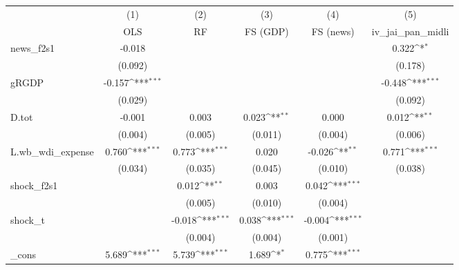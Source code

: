 {
\def\sym#1{\ifmmode^{#1}\else\(^{#1}\)\fi}
\begin{tabular}{l*{5}{c}}
\toprule
            &\multicolumn{1}{c}{(1)}&\multicolumn{1}{c}{(2)}&\multicolumn{1}{c}{(3)}&\multicolumn{1}{c}{(4)}&\multicolumn{1}{c}{(5)}\\
            &\multicolumn{1}{c}{OLS}&\multicolumn{1}{c}{RF}&\multicolumn{1}{c}{FS (GDP)}&\multicolumn{1}{c}{FS (news)}&\multicolumn{1}{c}{iv\_jai\_pan\_midli}\\
\midrule
news\_f2s1   &      -0.018         &                     &                     &                     &       0.322\sym{*}  \\
            &     (0.092)         &                     &                     &                     &     (0.178)         \\
\addlinespace
gRGDP       &      -0.157\sym{***}&                     &                     &                     &      -0.448\sym{***}\\
            &     (0.029)         &                     &                     &                     &     (0.092)         \\
\addlinespace
D.tot       &      -0.001         &       0.003         &       0.023\sym{**} &       0.000         &       0.012\sym{**} \\
            &     (0.004)         &     (0.005)         &     (0.011)         &     (0.004)         &     (0.006)         \\
\addlinespace
L.wb\_wdi\_expense&       0.760\sym{***}&       0.773\sym{***}&       0.020         &      -0.026\sym{**} &       0.771\sym{***}\\
            &     (0.034)         &     (0.035)         &     (0.045)         &     (0.010)         &     (0.038)         \\
\addlinespace
shock\_f2s1  &                     &       0.012\sym{**} &       0.003         &       0.042\sym{***}&                     \\
            &                     &     (0.005)         &     (0.010)         &     (0.004)         &                     \\
\addlinespace
shock\_t     &                     &      -0.018\sym{***}&       0.038\sym{***}&      -0.004\sym{***}&                     \\
            &                     &     (0.004)         &     (0.004)         &     (0.001)         &                     \\
\addlinespace
\_cons      &       5.689\sym{***}&       5.739\sym{***}&       1.689\sym{*}  &       0.775\sym{***}&                     \\

\end{tabular}}
